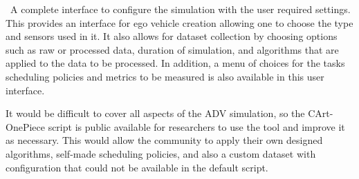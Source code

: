 \textbullet\ A complete interface to configure the simulation with the user required settings. This provides an interface for ego vehicle creation allowing one to choose the type and sensors used in it. It also allows for dataset collection by choosing options such as raw or processed data, duration of simulation, and algorithms that are applied to the data to be processed. In addition, a menu of choices for the tasks scheduling policies and metrics to be measured is also available in this user interface.

It would be difficult to cover all aspects of the ADV simulation, so the CArt-OnePiece script is public available for researchers to use the tool and improve it as necessary. This would allow the community to apply their own designed algorithms, self-made scheduling policies, and also a custom dataset with configuration that could not be available in the default script.







